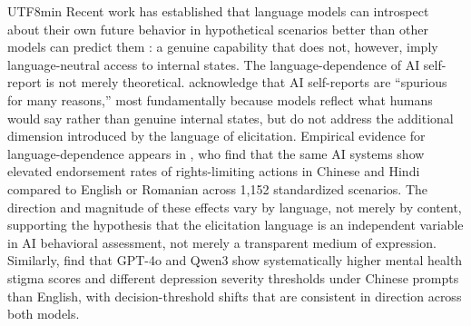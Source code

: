 \documentclass[12pt,a4paper]{article}
\begin{document}
\begin{CJK}{UTF8}{min}
Recent work has established that language models can introspect about their
own future behavior in hypothetical scenarios better than other models can
predict them \citep{binder2024introspection}: a genuine capability that does
not, however, imply language-neutral access to internal states.
The language-dependence of AI self-report is not merely theoretical.
\citet{perez2023selfreport} acknowledge that AI self-reports are ``spurious
for many reasons,'' most fundamentally because models reflect what humans would
say rather than genuine internal states, but do not address the additional
dimension introduced by the language of elicitation. Empirical evidence for
language-dependence appears in \citet{samway2026crosslingual}, who find that
the same AI systems show elevated endorsement rates of rights-limiting actions
in Chinese and Hindi compared to English or Romanian across 1,152 standardized
scenarios. The direction and magnitude of these effects vary by language, not
merely by content, supporting the hypothesis that the elicitation language is
an independent variable in AI behavioral assessment, not merely a transparent
medium of expression. Similarly, \citet{xu2026mentalhealth} find that GPT-4o
and Qwen3 show systematically higher mental health stigma scores and different
depression severity thresholds under Chinese prompts than English, with
decision-threshold shifts that are consistent in direction across both models.


\end{CJK}
\end{document}
